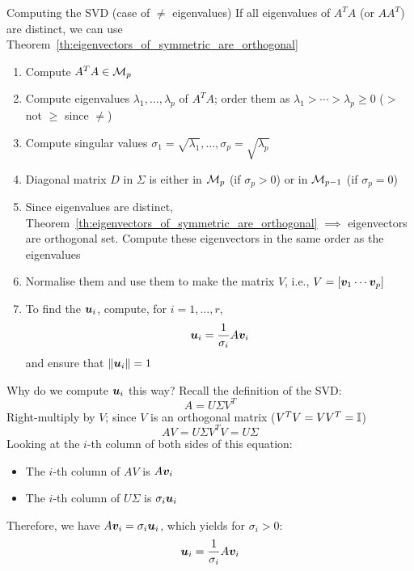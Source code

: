 \documentclass[aspectratio=169]{beamer}\usepackage[]{graphicx}\usepackage[]{xcolor}
\begin{document}
\begin{frame}{Computing the SVD (case of $\neq$ eigenvalues)}
If all eigenvalues of $A^TA$ (or $AA^T$) are distinct, we can use Theorem~\ref{th:eigenvectors_of_symmetric_are_orthogonal}
\vfill
\begin{enumerate}
\item Compute $A^TA\in\mathcal{M}_p$
\item Compute eigenvalues $\lambda_1,\ldots,\lambda_p$ of $A^TA$; order them as $\lambda_1>\cdots>\lambda_p\geq 0$ ($>$ not $\geq$ since $\neq$)
\item Compute singular values $\sigma_1=\sqrt{\lambda_1},\ldots,\sigma_p=\sqrt{\lambda_p}$
\item Diagonal matrix $D$ in $\Sigma$ is either in $\mathcal{M}_p$ (if $\sigma_p>0$) or in $\mathcal{M}_{p-1}$ (if $\sigma_p=0$)
\end{enumerate}
\end{frame}


\begin{frame}
\begin{enumerate}
\setcounter{enumi}{4}
\item Since eigenvalues are distinct, Theorem~\ref{th:eigenvectors_of_symmetric_are_orthogonal} $\implies$ eigenvectors are orthogonal set. Compute these eigenvectors in the same order as the eigenvalues
\item Normalise them and use them to make the matrix $V$, i.e., $V=[\bm{v}_1\cdots\bm{v}_p]$
\item To find the $\bm{u}_i$, compute, for $i=1,\ldots,r$,
\[
\bm{u}_i = \frac{1}{\sigma_i}A\bm{v}_i
\]
and ensure that $\|\bm{u}_i\|=1$
\end{enumerate}
\end{frame}


\begin{frame}{Why do we compute $\bm{u}_i$ this way?}
Recall the definition of the SVD:
\[
A = U\Sigma V^T
\]
Right-multiply by $V$; since $V$ is an orthogonal matrix ($V^TV = VV^T = \mathbb{I}$)
\[
AV = U\Sigma V^TV = U\Sigma
\]
Looking at the $i$-th column of both sides of this equation:
\begin{itemize}
\item The $i$-th column of $AV$ is $A\bm{v}_i$
\item The $i$-th column of $U\Sigma$ is $\sigma_i\bm{u}_i$
\end{itemize}
Therefore, we have $A\bm{v}_i = \sigma_i\bm{u}_i$, which yields for $\sigma_i > 0$:
\[
\bm{u}_i = \frac{1}{\sigma_i}A\bm{v}_i
\]
\end{frame}
\end{document}
